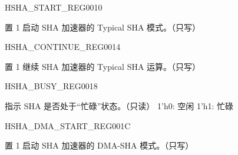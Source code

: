 \begin{register}{H}{SHA\_START\_REG}{\hexprefix{}0010}\label{regdesc:SHASTARTREG}
%
%
\regnewline%
\begin{regdesc}\begin{reglist}
\label{fielddesc:SHASTART}\item [SHA\_START] 置 1 启动 SHA 加速器的 Typical SHA 模式。（只写）
\end{reglist}\end{regdesc}
\end{register}


\begin{register}{H}{SHA\_CONTINUE\_REG}{\hexprefix{}0014}\label{regdesc:SHACONTINUEREG}
%
%
\regnewline%
\begin{regdesc}\begin{reglist}
\label{fielddesc:SHACONTINUE}\item [SHA\_CONTINUE] 置 1 继续 SHA 加速器的 Typical SHA 运算。（只写）
\end{reglist}\end{regdesc}
\end{register}


\begin{register}{H}{SHA\_BUSY\_REG}{\hexprefix{}0018}\label{regdesc:SHABUSYREG}
%
%
\regnewline%
\begin{regdesc}\begin{reglist}
\label{fielddesc:SHABUSYSTATE}\item [SHA\_BUSY\_STATE] 指示 SHA 是否处于“忙碌”状态。（只读）
1'h0: 空闲
1'h1: 忙碌
\end{reglist}\end{regdesc}
\end{register}


\begin{register}{H}{SHA\_DMA\_START\_REG}{\hexprefix{}001C}\label{regdesc:SHADMASTARTREG}
%
%
\regnewline%
\begin{regdesc}\begin{reglist}
\label{fielddesc:SHADMASTART}\item [SHA\_DMA\_START] 置 1 启动 SHA 加速器的 DMA-SHA 模式。（只写）
\end{reglist}\end{regdesc}
\end{register}


